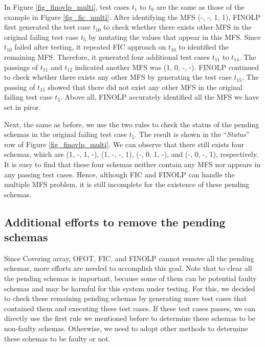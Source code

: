In Figure \ref{fig_finovlp_multi}, test cases $t_{1}$ to $t_{9}$ are the same as those of the example in Figure \ref{fig_fic_multi}.  After identifying the MFS (-, -, 1, 1), FINOLP first generated the test case $t_{10}$ to check whether there exists other MFS in the original failing test case $t_{5}$ by mutating the values that appear in this MFS. Since $t_{10}$ failed after testing, it repeated FIC approach on $t_{10}$ to identified the remaining MFS. Therefore, it generated four additional test cases $t_{11}$ to $t_{14}$. The passings of $t_{11}$ and $t_{12}$ indicated another MFS was (1, 0, -, -). FINOLP continued to check whether there exists any other MFS by generating the test case $t_{15}$. The passing of $t_{15}$ showed that there did not exist any other MFS in the original failing test case $t_{5}$. Above all, FINOLP accurately identified all the MFS we have set in piror.

Next, the same as before, we use the two rules to check the status of the pending schemas in the original failing test case $t_{5}$. The result is shown in the ``\emph{Status}'' row of Figure \ref{fig_finovlp_multi}. We can observe that there still exists four schemas, which are (1, -, 1, -), (1, -, -, 1), (-, 0, 1, -), and (-, 0, -, 1), respectively. It is easy to find that these four schemas neither contain any MFS nor appears in any passing test cases. Hence, although FIC and FINOLP can handle the multiple MFS problem, it is still incomplete for the existence of these pending schemas.

\subsection{Additional efforts to remove the pending schemas}

Since Covering array, OFOT, FIC, and FINOLP cannot remove all the pending schemas, more efforts are needed to accomplish this goal. Note that to clear all the pending schemas is important, because some of them can be potential faulty schemas and may be harmful for this system under testing. For this, we decided to check these remaining pending schemas by generating more test cases that contained them and executing these test cases. If these test cases passes, we can directly use the first rule we mentioned before to determine these schemas to be non-faulty schemas. Otherwise, we need to adopt other methods to determine these schemas to be faulty or not.

